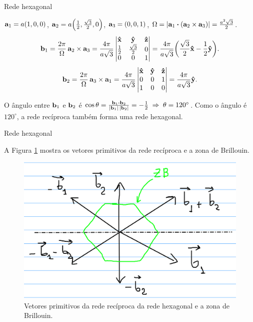 \documentclass[aspectratio=169]{beamer}
\begin{document}
\begin{frame}{Rede hexagonal}

$\vb{a}_1 = a(1,0,0)$, $\vb{a}_2 = a\qty(\frac{1}{2},\frac{\sqrt{3}}{2},0)$, $\vb{a}_3 = (0,0,1)$, $\Omega = \abs{\a_1 \vdot (\a_2 \times \a_3)} = \frac{a^2 \sqrt{3}}{2}$.
$$
\vb{b}_1 = \frac{2\pi}{\Omega} \, \vb{a}_2 \times \vb{a}_3 =
\frac{4\pi}{a \sqrt{3}}
\begin{vmatrix}
\vu{x} & \vu{y} & \vu{z} \\
\frac{1}{2} & \frac{\sqrt{3}}{2} & 0 \\
0 & 0 & 1 \\
\end{vmatrix}
=
\frac{4\pi}{a \sqrt{3}} \qty(\frac{\sqrt{3}}{2} \vu{x} - \frac{1}{2} \vu{y}).
$$
$$
\vb{b}_2 = \frac{2\pi}{\Omega} \, \vb{a}_3 \times \vb{a}_1 =
\frac{4\pi}{a \sqrt{3}}
\begin{vmatrix}
\vu{x} & \vu{y} & \vu{z} \\
0 & 0 & 1 \\
1 & 0 & 0 \\
\end{vmatrix}
= \frac{4\pi}{a\sqrt{3}} \vu{y}.
$$

O ângulo entre $\vb{b}_1$ e $\vb{b}_2$ é $\cos\theta = \frac{\b_1 \vdot \b_2}{\abs{\b_1}\,\abs{\b_2}} = -\frac{1}{2} \implies \theta = 120^\circ$. Como o ângulo é $120^\circ$, a rede recíproca também forma uma rede hexagonal.

\end{frame}




\begin{frame}{Rede hexagonal}

A Figura \ref{fig:hex_bz} mostra os vetores primitivos da rede recíproca e a zona de Brillouin.

\begin{figure}[H]
\centering
\includegraphics[width=0.65\linewidth]{fig/hex_bz}
\caption{Vetores primitivos da rede recíproca da rede hexagonal e a zona de Brillouin.}
\label{fig:hex_bz}
\end{figure}

\end{frame}
\end{document}

